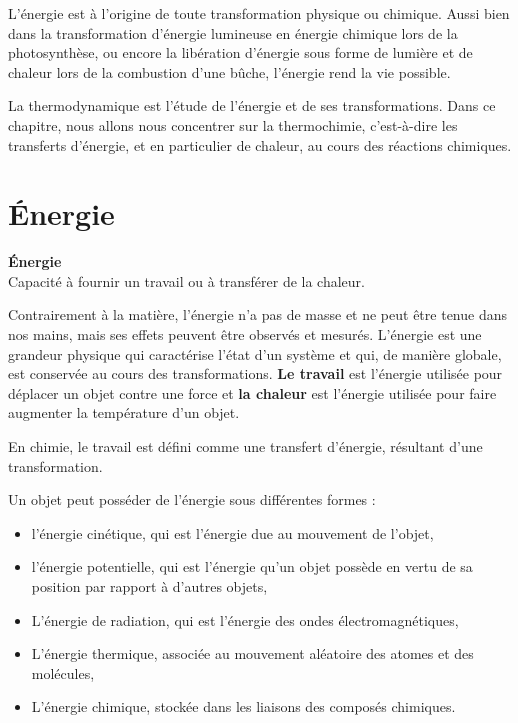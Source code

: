 \documentclass[
  11pt,
  a4paper,
  openany]{book}
\providecommand{\tightlist}{%
  \setlength{\itemsep}{0pt}\setlength{\parskip}{0pt}}
\begin{document}
L'énergie est à l'origine de toute transformation physique ou chimique. Aussi bien dans la transformation d'énergie lumineuse en énergie chimique lors de la photosynthèse, ou encore la libération d'énergie sous forme de lumière et de chaleur lors de la combustion d'une bûche, l'énergie rend la vie possible.

La thermodynamique est l'étude de l'énergie et de ses transformations. Dans ce chapitre, nous allons nous concentrer sur la thermochimie, c'est-à-dire les transferts d'énergie, et en particulier de chaleur, au cours des réactions chimiques.

\section{Énergie}\label{uxe9nergie}

\begin{tcolorbox}
\textbf{Énergie}\\
Capacité à fournir un travail ou à transférer de la chaleur.

\end{tcolorbox}

Contrairement à la matière, l'énergie n'a pas de masse et ne peut être tenue dans nos mains, mais ses effets peuvent être observés et mesurés. L'énergie est une grandeur physique qui caractérise l'état d'un système et qui, de manière globale, est conservée au cours des transformations. \textbf{Le travail} est l'énergie utilisée pour déplacer un objet contre une force et \textbf{la chaleur} est l'énergie utilisée pour faire augmenter la température d'un objet.

En chimie, le travail est défini comme une transfert d'énergie, résultant d'une transformation.

\clearpage

Un objet peut posséder de l'énergie sous différentes formes :

\begin{itemize}
\tightlist
\item
  l'énergie cinétique, qui est l'énergie due au mouvement de l'objet,
\item
  l'énergie potentielle, qui est l'énergie qu'un objet possède en vertu de sa position par rapport à d'autres objets,
\item
  L'énergie de radiation, qui est l'énergie des ondes électromagnétiques,
\item
  L'énergie thermique, associée au mouvement aléatoire des atomes et des molécules,
\item
  L'énergie chimique, stockée dans les liaisons des composés chimiques.
\end{itemize}
\end{document}
